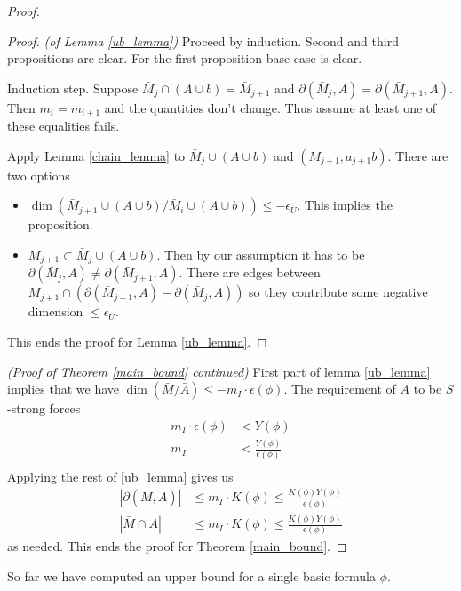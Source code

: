 \documentclass{amsart}
\begin{document}
\begin{proof}
  \begin{proof} \textit{(of Lemma \ref{ub_lemma})}
    Proceed by induction.
    Second and third propositions are clear.
    For the first proposition base case is clear.
    
    Induction step.
    Suppose $\bar M_j \cap (A \cup b) = \bar M_{j+1}$ and $\partial(\bar M_j, A) = \partial(\bar M_{j+1}, A)$.
    Then $m_i = m_{i+1}$ and the quantities don't change.
    Thus assume at least one of these equalities fails.
    
    Apply Lemma \ref{chain_lemma} to $\bar M_j \cup (A \cup b)$ and $(M_{j+1}, a_{j+1}b)$.
    There are two options
    
    \begin{itemize}
    \item $\dim(\bar M_{j+1} \cup (A \cup b) / \bar M_i \cup (A \cup b)) \leq -\epsilon_U$.
      This implies the proposition.
    \item $M_{j+1} \subset \bar M_j \cup (A \cup b)$.
      Then by our assumption it has to be $\partial(\bar M_j, A) \neq \partial(\bar M_{j+1}, A)$.
      There are edges between $M_{j+1} \cap (\partial(\bar M_{j+1}, A) - \partial(\bar M_j, A))$ so they contribute some negative dimension $\leq \epsilon_U$.
    \end{itemize}
    This ends the proof for Lemma \ref{ub_lemma}.
  \end{proof}
  \textit{(Proof of Theorem \ref{main_bound} continued)}
  First part of lemma \ref{ub_lemma} implies that we have $\dim(\bar M / \bar A) \leq -m_I \cdot \epsilon(\phi)$.
  The requirement of $A$ to be $S$-strong forces
  \begin{align*}
    m_I \cdot \epsilon(\phi) &< Y(\phi) \\
    m_I  &< \frac{Y(\phi)}{\epsilon(\phi)} \\
  \end{align*}
  Applying the rest of \ref{ub_lemma} gives us
  \begin{align*}
    |\partial(\bar M, A)| &\leq m_I \cdot K(\phi) \leq \frac{K(\phi)Y(\phi)}{\epsilon(\phi)} \\
    |\bar M \cap A| &\leq m_I \cdot K(\phi) \leq \frac{K(\phi)Y(\phi)}{\epsilon(\phi)}
  \end{align*}
  as needed.
  This ends the proof for Theorem \ref{main_bound}.
\end{proof}

So far we have computed an upper bound for a single basic formula $\phi$.
\end{document}
